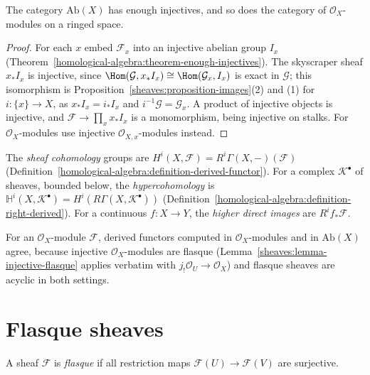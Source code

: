 \begin{theorem}\label{sheaves:theorem-enough-injectives}
The category $\mathrm{Ab}(X)$ has enough injectives, and so does the category of $\mathcal{O}_X$-modules on a ringed space.
\end{theorem}

\begin{proof}
For each $x$ embed $\mathcal{F}_x$ into an injective abelian group $I_x$ (Theorem~\ref{homological-algebra:theorem-enough-injectives}). The skyscraper sheaf $x_*I_x$ is injective,
since $\Hom(\mathcal{G}, x_*I_x) \cong \Hom(\mathcal{G}_x, I_x)$ is exact in $\mathcal{G}$; this isomorphism is Proposition~\ref{sheaves:proposition-images}(2) and (1) for $i \colon \{x\} \to X$, as $x_*I_x = i_*I_x$ and $i^{-1}\mathcal{G} = \mathcal{G}_x$. A product of injective objects is
injective, and $\mathcal{F} \to \prod_x x_*I_x$ is a monomorphism, being injective on stalks. For $\mathcal{O}_X$-modules use injective $\mathcal{O}_{X,x}$-modules instead.
\end{proof}

\begin{definition}\label{sheaves:definition-sheaf-cohomology}
The \emph{sheaf cohomology} groups are $H^i(X, \mathcal{F}) = R^i\Gamma(X, -)(\mathcal{F})$ (Definition~\ref{homological-algebra:definition-derived-functor}). For a complex
$\mathcal{K}^\bullet$ of sheaves, bounded below, the \emph{hypercohomology} is $\mathbb{H}^i(X, \mathcal{K}^\bullet) = H^i(R\Gamma(X, \mathcal{K}^\bullet))$
(Definition~\ref{homological-algebra:definition-right-derived}). For a continuous $f \colon X \to Y$, the \emph{higher direct images} are $R^if_*\mathcal{F}$.
\end{definition}

\begin{remark}\label{sheaves:remark-cohomology-modules}
For an $\mathcal{O}_X$-module $\mathcal{F}$, derived functors computed in $\mathcal{O}_X$-modules and in $\mathrm{Ab}(X)$ agree, because injective $\mathcal{O}_X$-modules are flasque
(Lemma~\ref{sheaves:lemma-injective-flasque} applies verbatim with $j_!\mathcal{O}_U \to \mathcal{O}_X$) and flasque sheaves are acyclic in both settings.
\end{remark}

\section{Flasque sheaves}\label{sheaves:section-flasque}

\begin{definition}\label{sheaves:definition-flasque}
A sheaf $\mathcal{F}$ is \emph{flasque} if all restriction maps $\mathcal{F}(U) \to \mathcal{F}(V)$ are surjective.
\end{definition}

